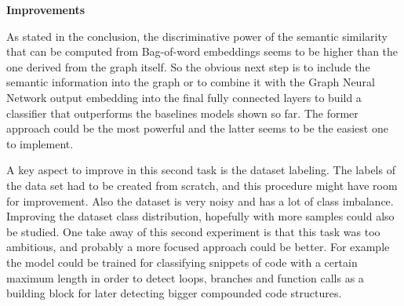 




\textbf{Improvements}

As stated in the conclusion, the discriminative power of the semantic similarity that can be computed from Bag-of-word embeddings seems to be higher than the one derived from the graph itself. So the obvious next step is to include the semantic information into the graph or to combine it with the Graph Neural Network output embedding into the final fully connected layers to build a classifier that outperforms the baselines models shown so far. The former approach could be the most powerful and the latter seems to be the easiest one to implement.

A key aspect to improve in this second task is the dataset labeling. The labels of the data set had to be created from scratch, and this procedure might have room for improvement. Also the dataset is very noisy and has a lot of class imbalance. Improving the dataset class distribution, hopefully with more samples could also be studied. One take away of this second experiment is that this task was too ambitious, and probably a more focused approach could be better. For example the model could be trained for classifying snippets of code with a certain maximum length in order to detect loops, branches and function calls as a building block for later detecting bigger compounded code structures.